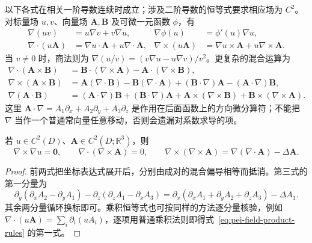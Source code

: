 以下各式在相关一阶导数连续时成立；涉及二阶导数的恒等式要求相应场为 $C^2$。对标量场 $u,v$、向量场 $\boldsymbol A,\boldsymbol B$ 及可微一元函数 $\phi$，有
\begin{align}
\nabla(uv)&=u\nabla v+v\nabla u,
&\nabla\phi(u)&=\phi'(u)\nabla u,
\label{eq:pei-gradient-rules}\\
\nabla\cdot(u\boldsymbol A)&=\nabla u\cdot\boldsymbol A+u\nabla\cdot\boldsymbol A,
&\nabla\times(u\boldsymbol A)&=\nabla u\times\boldsymbol A+u\nabla\times\boldsymbol A.
\label{eq:pei-field-product-rules}
\end{align}
当 $v\ne0$ 时，商法则为 $\nabla(u/v)=(v\nabla u-u\nabla v)/v^2$。更复杂的混合运算为
\begin{align}
\nabla\cdot(\boldsymbol A\times\boldsymbol B)
&=\boldsymbol B\cdot(\nabla\times\boldsymbol A)
-\boldsymbol A\cdot(\nabla\times\boldsymbol B),
\label{eq:pei-div-cross}\\
\nabla\times(\boldsymbol A\times\boldsymbol B)
&=\boldsymbol A(\nabla\cdot\boldsymbol B)
-\boldsymbol B(\nabla\cdot\boldsymbol A)
+(\boldsymbol B\cdot\nabla)\boldsymbol A
-(\boldsymbol A\cdot\nabla)\boldsymbol B,
\label{eq:pei-curl-cross}\\
\nabla(\boldsymbol A\cdot\boldsymbol B)
&=(\boldsymbol A\cdot\nabla)\boldsymbol B
+(\boldsymbol B\cdot\nabla)\boldsymbol A
+\boldsymbol A\times(\nabla\times\boldsymbol B)
+\boldsymbol B\times(\nabla\times\boldsymbol A).
\label{eq:pei-grad-dot}
\end{align}
这里 $\boldsymbol A\cdot\nabla=A_1\partial_x+A_2\partial_y+A_3\partial_z$ 是作用在后面函数上的方向微分算符；不能把 $\nabla$ 当作一个普通常向量任意移动，否则会遗漏对系数求导的项。

\begin{proposition}
\label{prop:pei-differential-identities}
若 $u\in C^2(D)$、$\boldsymbol A\in C^2(D;\mathbb R^3)$，则
\begin{equation}
\label{eq:pei-curl-grad-div-curl}
\nabla\times\nabla u=\boldsymbol0,
\qquad\nabla\cdot(\nabla\times\boldsymbol A)=0,
\qquad\nabla\times(\nabla\times\boldsymbol A)
=\nabla(\nabla\cdot\boldsymbol A)-\Delta\boldsymbol A.
\end{equation}
\end{proposition}
\begin{proof}
前两式把坐标表达式展开后，分别由成对的混合偏导相等而抵消。第三式的第一分量为
\[
\partial_y(\partial_x A_2-\partial_y A_1)
-\partial_z(\partial_z A_1-\partial_x A_3)
=\partial_x(\partial_x A_1+\partial_y A_2+\partial_z A_3)-\Delta A_1.
\]
其余两分量循环换标即可。乘积恒等式也可按同样的方法逐分量核验，例如 $\nabla\cdot(u\boldsymbol A)=\sum_i\partial_i(uA_i)$，逐项用普通乘积法则即得式~\eqref{eq:pei-field-product-rules} 的第一式。
\end{proof}

